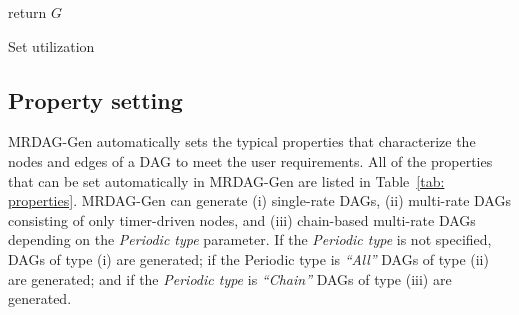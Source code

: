 \begin{algorithm}[t]
    {\footnotesize
        return $G$
        \caption{Set utilization}
        \label{alg: set_utilization}
    }
\end{algorithm}


\subsection{Property setting}
\label{ssec: set_properties}

MRDAG-Gen automatically sets the typical properties that characterize the nodes and edges of a DAG to meet the user requirements. All of the properties that can be set automatically in MRDAG-Gen are listed in Table~\ref{tab: properties}.
MRDAG-Gen can generate (i) single-rate DAGs, (ii) multi-rate DAGs consisting of only timer-driven nodes, and (iii) chain-based multi-rate DAGs depending on the {\it Periodic type} parameter.
If the {\it Periodic type} is not specified, DAGs of type (i) are generated; if the Periodic type is {\it “All”} DAGs of type (ii) are generated; and if the {\it Periodic type} is {\it “Chain”} DAGs of type (iii) are generated.

